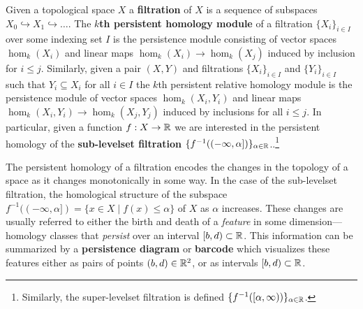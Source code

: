 
Given a topological space $X$ a \textbf{filtration} of $X$ is a sequence of subspaces $X_0\hookrightarrow X_1\hookrightarrow\ldots$.
The \textbf{$k$th persistent homology module} of a filtration $\{X_i\}_{i\in I}$ over some indexing set $I$ is the persistence module consisting of vector spaces $\hom_k(X_i)$ and linear maps $\hom_k(X_i)\to \hom_k(X_j)$ induced by inclusion for $i\leq j$.
Similarly, given a pair $(X,Y)$ and filtrations $\{X_i\}_{i\in I}$ and $\{Y_i\}_{i\in I}$ such that $Y_i\subseteq X_i$ for all $i\in I$ the $k$th persistent relative homology module is the persistence module of vector spaces $\hom_k(X_i, Y_i)$ and linear maps $\hom_k(X_i, Y_i)\to\hom_k(X_j, Y_j)$ induced by inclusions for all $i\leq j$.
In particular, given a function $f: X\to \mathbb{R}$ we are interested in the persistent homology of the \textbf{sub-levelset filtration} $\{f^{-1}((-\infty, \alpha])\}_{\alpha\in\mathbb{R}}$..\footnote{Similarly, the super-levelset filtration is defined $\{f^{-1}([\alpha,\infty))\}_{\alpha\in\mathbb{R}}$.}

The persistent homology of a filtration encodes the changes in the topology of a space as it changes monotonically in some way.
In the case of the sub-levelset filtration, the homological structure of the subspace $f^{-1}((-\infty,\alpha]) = \{x\in X\mid f(x) \leq \alpha\}$ of $X$ as $\alpha$ increases.
These changes are usually referred to either the birth and death of a \emph{feature} in some dimension---homology classes that \emph{persist} over an interval $[b, d)\subset\mathbb{R}$.
This information can be summarized by a \textbf{persistence diagram} or \textbf{barcode} which visualizes these features either as pairs of points $(b, d)\in\mathbb{R}^2$, or as intervals $[b, d)\subset\mathbb{R}$.
